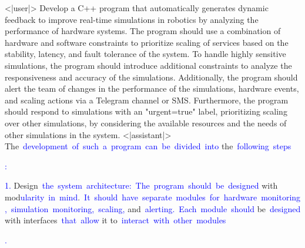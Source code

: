 \documentclass{article}
\begin{document}
\begin{tcolorbox}[colframe=black,colback=white]
<|user|>
Develop a C++ program that automatically generates dynamic feedback to improve real-time simulations in robotics by analyzing the performance of hardware systems. The program should use a combination of hardware and software constraints to prioritize scaling of services based on the stability, latency, and fault tolerance of the system. To handle highly sensitive simulations, the program should introduce additional constraints to analyze the responsiveness and accuracy of the simulations. Additionally, the program should alert the team of changes in the performance of the simulations, hardware events, and scaling actions via a Telegram channel or SMS. Furthermore, the program should respond to simulations with an "urgent=true" label, prioritizing scaling over other simulations, by considering the available resources and the needs of other simulations in the system.
<|assistant|>
The\textcolor{blue}{~development}\textcolor{blue}{~of}\textcolor{blue}{~such}\textcolor{blue}{~a}\textcolor{blue}{~program}\textcolor{blue}{~can}\textcolor{blue}{~be}\textcolor{blue}{~divided}\textcolor{blue}{~into} the\textcolor{blue}{~following}\textcolor{blue}{~steps}\textcolor{blue}{:

}\textcolor{blue}{1}\textcolor{blue}{.} Design\textcolor{blue}{~the}\textcolor{blue}{~system}\textcolor{blue}{~architecture}\textcolor{blue}{:}\textcolor{blue}{~The}\textcolor{blue}{~program}\textcolor{blue}{~should}\textcolor{blue}{~be}\textcolor{blue}{~designed} with mod\textcolor{blue}{ularity}\textcolor{blue}{~in}\textcolor{blue}{~mind}.\textcolor{blue}{~It}\textcolor{blue}{~should}\textcolor{blue}{~have}\textcolor{blue}{~separate}\textcolor{blue}{~modules}\textcolor{blue}{~for}\textcolor{blue}{~hardware}\textcolor{blue}{~monitoring}\textcolor{blue}{,}\textcolor{blue}{~simulation}\textcolor{blue}{~monitoring}\textcolor{blue}{,}\textcolor{blue}{~scaling}\textcolor{blue}{,} and\textcolor{blue}{~alert}\textcolor{blue}{ing}\textcolor{blue}{.}\textcolor{blue}{~Each}\textcolor{blue}{~module}\textcolor{blue}{~should} be\textcolor{blue}{~designed} with interfaces\textcolor{blue}{~that}\textcolor{blue}{~allow} it to\textcolor{blue}{~interact}\textcolor{blue}{~with}\textcolor{blue}{~other}\textcolor{blue}{~modules}\textcolor{blue}{.

}
\end{tcolorbox}
\end{document}
